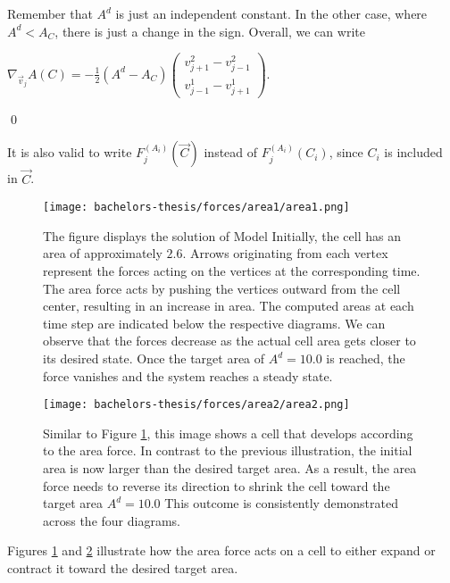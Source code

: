 \begin{proposition}
	Remember that $A^d$ is just an independent constant. 
	In the other case, where $A^d < A_{C}$, there is just a change in the sign. 
	Overall, we can write 
\begin{center}
	$
	\nabla_{\vec{v}_j} A(C) = - \frac{1}{2} (A^d - A_{C}) \begin{pmatrix}
		v_{j+1}^2 - v_{j-1}^2  \\[0.5em]
	   v_{j-1}^1  - v_{j+1}^1 
  	\end{pmatrix}.
	$
\end{center}

	\qed
\end{proposition}
It is also valid to write $F_{j}^{(A_i)}(\vec{C})$ instead of $F_{j}^{(A_i)}(C_i)$, since $C_i$ is included in $\vec{C}$. 


\begin{figure}
	\begin{center}
		\texttt{[image: bachelors-thesis/forces/area1/area1.png]}
		\caption{The figure displays the solution of Model  
		Initially, the cell has an area of approximately $2.6$. 
		Arrows originating from each vertex represent the forces acting on the vertices at the corresponding time.
		The area force acts by pushing the vertices outward from the cell center, resulting in an increase in area.
		The computed areas at each time step are indicated below the respective diagrams.
		We can observe that the forces decrease as the actual cell area gets closer to its desired state. 
		Once the target area of $A^d = 10.0$ is reached, the force vanishes and the system reaches a steady state.
		}
		\label{fig:areaForce}
	\end{center}
\end{figure}

\begin{figure}
	\begin{center}
		\texttt{[image: bachelors-thesis/forces/area2/area2.png]}
		\caption{Similar to Figure \ref{fig:areaForce}, this image shows a cell that develops according to the area force. 
		In contrast to the previous illustration, the initial area is now larger than the desired target area.
		As a result, the area force needs to reverse its direction to shrink the cell toward the target area $A^d = 10.0$
		This outcome is consistently demonstrated across the four diagrams. }
		\label{fig:areaForce2}
	\end{center}
\end{figure}

Figures \ref{fig:areaForce} and \ref{fig:areaForce2} illustrate how the area force acts on a cell to either expand or contract it toward the desired target area.

